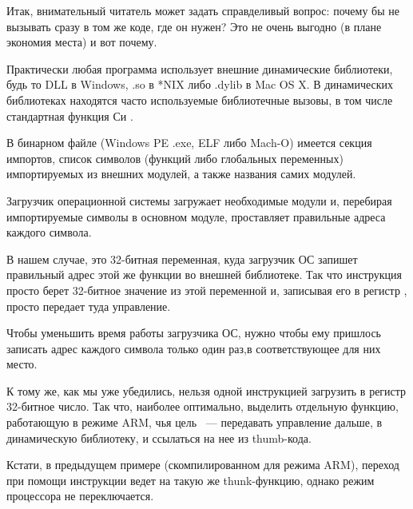 Итак, внимательный читатель может задать справделивый вопрос: почему бы не вызывать  сразу в том же коде,
где он нужен? Это не очень выгодно (в плане экономия места) и вот почему. 

Практически любая программа использует внешние динамические библиотеки, будь то DLL в Windows, .so в *NIX либо .dylib в Mac OS X. В динамических библиотеках
находятся часто используемые библиотечные вызовы, в том числе стандартная функция Си . 

В бинарном файле (Windows PE .exe, ELF либо Mach-O) имеется секция импортов, список символов (функций либо глобальных переменных) импортируемых из внешних модулей, а также названия самих модулей. 

Загрузчик операционной системы загружает необходимые модули и, перебирая импортируемые символы в основном модуле, проставляет правильные адреса каждого символа.

В нашем случае,  это 32-битная переменная, куда загрузчик ОС запишет правильный адрес этой же функции во внешней библиотеке. Так что инструкция  просто берет 32-битное значение из этой переменной и, записывая его в регистр , просто передает туда управление. 

Чтобы уменьшить время работы загрузчика ОС, нужно чтобы ему пришлось записать адрес каждого символа только один раз,в соответствующее для них место.

К тому же, как мы уже убедились, нельзя одной инструкцией загрузить в регистр 32-битное число.
Так что, наиболее оптимально, выделить отдельную функцию, работающую в режиме ARM, чья цель ~--- передавать
управление дальше, в динамическую библиотеку, и ссылаться на нее из thumb-кода.

Кстати, в предыдущем примере (скомпилированном для режима ARM), переход при помощи инструкции  ведет 
на такую же thunk-функцию, однако режим процессора не переключается.

